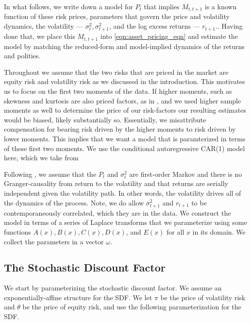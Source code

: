 \documentclass[11pt, letterpaper, twoside, final]{article}
\begin{document}
In what follows, we write down a model for $P_t$ that implies $M_{t,t+1}$ is a known function of these risk prices, parameters that govern the price and volatility dynamics, the volatility --- $\sigma^2_{t}, \sigma^2_{t+1}$, and the log excess returns --- $r_{t+1}$.. Having done that, we place this $M_{t,t+1}$ into \cref{eqn:asset_pricing_eqn} and estimate the model by matching the reduced-form and model-implied dynamics of the returns and polities.

Throughout we assume that the two risks that are priced in the market are equity risk and volatility risk as we discussed in the introduction. This motivates us to focus on the first two moments of the data. If higher moments, such as skewness and kurtosis are also priced factors, as in \textcites{harvey2000conditional, conrad2012exante, chang2013market}, and we used higher sample moments as well to determine the price of our risk-factors our resulting estimates would be biased, likely substantially so.  Essentially, we misattribute compensation for bearing risk driven by the higher moments to risk driven by lower moments. This implies that we want a model that is paramterized in terms of these first two moments. We use the conditional autoregressive CAR(1) model here, which we take from \textcite{darolles2006structural,khrapov2016affine}

Following \textcite{khrapov2016affine}, we assume that the $P_t$ and $\sigma^2_t$ are first-order Markov and there is no Granger-causality from return to the volatility and that returns are serially independent given the volatility path. In other words, the volatility drives all of the dynamics of the process. Note, we do allow $\sigma^2_{t+1}$ and $r_{t+1}$ to be contemporaneously correlated, which they are in the data.  We construct the model in terms of a series of Laplace transforms that we parameterize using some functions $A(x), B(x), C(x), D(x)$, and $E(x)$ for all $x$ in its domain. We collect the parameters in a vector $\omega$.

\subsection{The Stochastic Discount Factor}\label{sec:deriving_sdf_functions}

We start by parameterizing the stochastic discount factor.  We assume an exponentially-affine structure for the SDF. We let $\pi$ be the price of volatility risk and $\theta$ be the price of equity risk, and use the following parameterization for the SDF.
\end{document}
